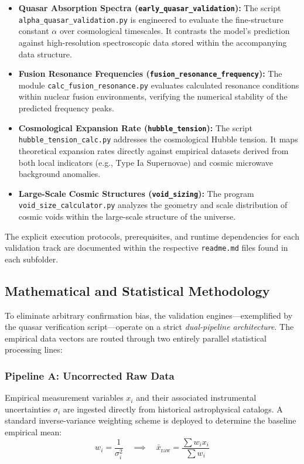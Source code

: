 \documentclass[11pt,a4paper]{article}
\theoremstyle{plain}
\theoremstyle{definition}
\theoremstyle{remark}
\begin{document}
\begin{itemize}
    \item \textbf{Quasar Absorption Spectra (\texttt{early\_quasar\_validation}):} 
    The script \texttt{alpha\_quasar\_validation.py} is engineered to evaluate the fine-structure constant $\alpha$ over cosmological timescales. It contrasts the model's prediction against high-resolution spectroscopic data stored within the accompanying data structure.
    
    \item \textbf{Fusion Resonance Frequencies (\texttt{fusion\_resonance\_frequency}):} 
    The module \texttt{calc\_fusion\_resonance.py} evaluates calculated resonance conditions within nuclear fusion environments, verifying the numerical stability of the predicted frequency peaks.
    
    \item \textbf{Cosmological Expansion Rate (\texttt{hubble\_tension}):} 
    The script \texttt{hubble\_tension\_calc.py} addresses the cosmological Hubble tension. It maps theoretical expansion rates directly against empirical datasets derived from both local indicators (e.g., Type Ia Supernovae) and cosmic microwave background anomalies.
    
    \item \textbf{Large-Scale Cosmic Structures (\texttt{void\_sizing}):} 
    The program \texttt{void\_size\_calculator.py} analyzes the geometry and scale distribution of cosmic voids within the large-scale structure of the universe.
\end{itemize}

The explicit execution protocols, prerequisites, and runtime dependencies for each validation track are documented within the respective \texttt{readme.md} files found in each subfolder.

\subsection{Mathematical and Statistical Methodology}
To eliminate arbitrary confirmation bias, the validation engines—exemplified by the quasar verification script—operate on a strict \textit{dual-pipeline architecture}. The empirical data vectors are routed through two entirely parallel statistical processing lines:

\subsubsection{Pipeline A: Uncorrected Raw Data}
Empirical measurement variables $x_i$ and their associated instrumental uncertainties $\sigma_i$ are ingested directly from historical astrophysical catalogs. A standard inverse-variance weighting scheme is deployed to determine the baseline empirical mean:
\[ w_i = \frac{1}{\sigma_i^2} \quad \implies \quad \bar{x}_{\text{raw}} = \frac{\sum w_i x_i}{\sum w_i} \]
\end{document}
